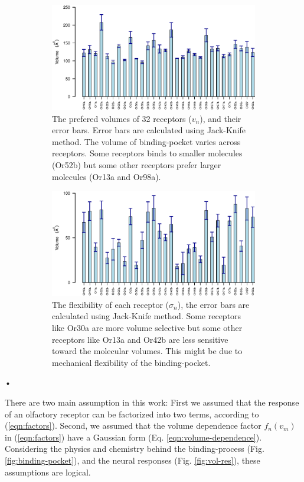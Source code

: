 \documentclass[11pt]{paper} %
\newcommand{\numberofreceptors}{32 }
\begin{document}
\begin{figure}
	\begin{subfigure}[b]{\textwidth}
		\includegraphics[width=\textwidth]{fig/mean-vol}
		\caption{The prefered volumes of \numberofreceptors receptors ($v_n$), and their error bars. Error bars are calculated using Jack-Knife method. 
		The volume of binding-pocket varies across receptors. 
		Some receptors binds to smaller molecules (Or52b) but some other receptors prefer larger molecules (Or13a and Or98a).}
		\label{fig:preferred_volume}
	\end{subfigure}
	\begin{subfigure}[b]{\textwidth}
		\includegraphics[width=\textwidth]{fig/std-vol}
		\caption{The flexibility of each receptor ($\sigma_n$), the error bars are calculated using Jack-Knife method.
		Some receptors like Or30a are more volume selective but some other receptors like Or13a and Or42b are less sensitive toward the molecular volumes.
		This might be due to mechanical flexibility of the binding-pocket.}
		\label{fig:volume_flexibility}
	\end{subfigure}
	\caption{}
\end{figure}•

There are two main assumption in this work: 
First we assumed that the response of an olfactory receptor can be factorized into two terms, 
according to (\ref{eqn:factors}).
Second, we assumed that the volume dependence factor $f_n(v_m)$ in (\ref{eqn:factors}) 
have a Gaussian form (Eq. \ref{eqn:volume-dependence}).
Considering the physics and chemistry behind the binding-process (Fig. \ref{fig:binding-pocket}), 
and the neural responses (Fig. \ref{fig:vol-res}), 
these assumptions are logical. 
\end{document}
